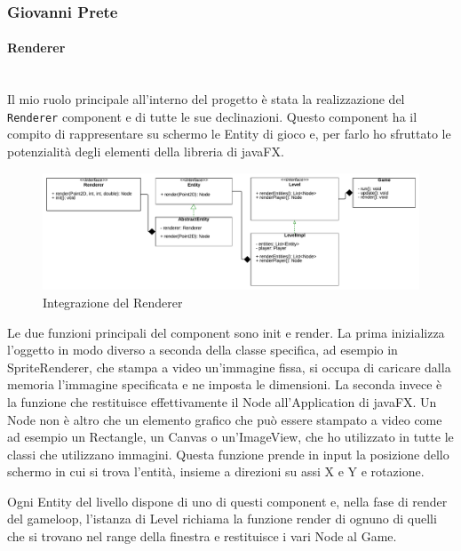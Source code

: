 \documentclass{article}
\begin{document}
\subsubsection{Giovanni Prete}

\paragraph{Renderer}\mbox{}\\

Il mio ruolo principale all'interno del progetto è stata la realizzazione del \texttt{Renderer} component e di tutte le sue declinazioni.
Questo component ha il compito di rappresentare su schermo le Entity di gioco e, per farlo ho sfruttato le potenzialità degli elementi della libreria di javaFX.

\begin{figure}[ht]
    \includegraphics[width=1\textwidth]{images/renderer.png}
    \caption{Integrazione del Renderer}
    \label{fig:renderer}
\end{figure}

Le due funzioni principali del component sono init e render.
La prima inizializza l'oggetto in modo diverso a seconda della classe specifica, ad esempio in SpriteRenderer, che stampa a video un'immagine fissa, si occupa di caricare dalla memoria l'immagine specificata e ne imposta le dimensioni.
La seconda invece è la funzione che restituisce effettivamente il Node all'Application di javaFX. Un Node non è altro che un elemento grafico che può essere stampato a video come ad esempio un Rectangle, un Canvas o un'ImageView, che ho utilizzato in tutte le classi che utilizzano immagini. Questa funzione prende in input la posizione dello schermo in cui si trova l'entità, insieme a direzioni su assi X e Y e rotazione.

Ogni Entity del livello dispone di uno di questi component e, nella fase di render del gameloop, l'istanza di Level richiama la funzione render di ognuno di quelli che si trovano nel range della finestra e restituisce i vari Node al Game.\\
\end{document}
